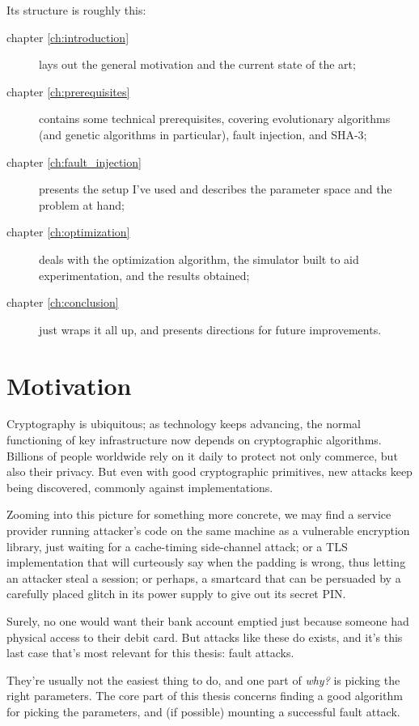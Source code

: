 \documentclass[times, utf8, diplomski]{fer}
\begin{document}
Its structure is roughly this:
\begin{description}
    \item[chapter \ref{ch:introduction}] lays out the general motivation and
          the current state of the art;
    \item[chapter \ref{ch:prerequisites}] contains some technical prerequisites,
          covering evolutionary algorithms (and genetic algorithms in particular),
          fault injection, and SHA-3;
    \item[chapter \ref{ch:fault_injection}] presents the setup I've used and
          describes the parameter space and the problem at hand;
    \item[chapter \ref{ch:optimization}] deals with the optimization algorithm,
          the simulator built to aid experimentation, and the results obtained;
    \item[chapter \ref{ch:conclusion}] just wraps it all up, and presents
          directions for future improvements.
\end{description}


\section{Motivation}
Cryptography is ubiquitous; as technology keeps advancing, the normal functioning
of key infrastructure now depends on cryptographic algorithms. Billions of people
worldwide rely on it daily to protect not only commerce, but also their privacy.
But even with good cryptographic primitives, new attacks keep being discovered,
commonly against implementations.

Zooming into this picture for something more concrete, we may find a service
provider running attacker's code on the same machine as a vulnerable encryption
library, just waiting for a cache-timing side-channel attack; or a TLS
implementation that will curteously say when the padding is wrong, thus letting
an attacker steal a session; or perhaps, a smartcard that can be persuaded by a
carefully placed glitch in its power supply to give out its secret PIN.

Surely, no one would want their bank account emptied just because someone had
physical access to their debit card. But attacks like these do exists, and it's
this last case that's most relevant for this thesis: fault attacks.

They're usually not the easiest thing to do, and one part of \emph{why?} is
picking the right parameters. The core part of this thesis concerns finding
a good algorithm for picking the parameters, and (if possible) mounting a
successful fault attack.
\end{document}
